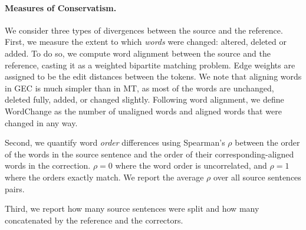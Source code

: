 \documentclass[letterpaper, 11pt]{article}
\begin{document}
\paragraph{Measures of Conservatism.}
We consider three types of divergences between the source and the reference.
First, we measure the extent to which \emph{words} were changed: altered, deleted or added.
To do so, we compute word alignment between the source and the reference, casting it
as a weighted bipartite matching problem. Edge weights are assigned to be the edit distances between the tokens.
We note that aligning words in GEC is much simpler than in MT,
as most of the words are unchanged, deleted fully, added, or changed slightly.
Following word alignment, we define {\sc WordChange}
as the number of unaligned words and aligned words that were changed in any way.

Second, we quantify word \emph{order} differences using
Spearman's $\rho$ between the order of the words in the source sentence
and the order of their corresponding-aligned words in the correction.
$\rho=0$ where the word order is uncorrelated, and $\rho=1$ where the orders exactly match. We report the average $\rho$ over all source sentences pairs. 

Third, we report how many source sentences were split and how many concatenated by the reference and the correctors.
\end{document}

